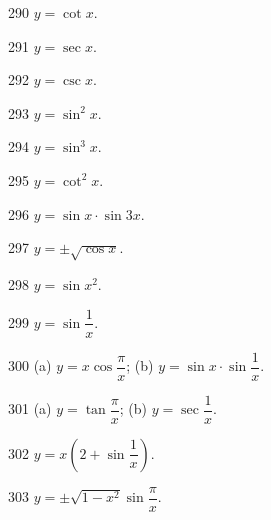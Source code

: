 \begin{prob}[S]{290}
$y = \cot x$.
\end{prob}

\begin{prob}[S]{291}
$y = \sec x$.
\end{prob}

\begin{prob}[S]{292}
$y = \csc x$.
\end{prob}

\begin{prob}[S]{293}
$y = \sin^2 x$.
\end{prob}

\begin{prob}[S]{294}
$y = \sin^3 x$.
\end{prob}

\begin{prob}[S]{295}
$y = \cot^2 x$.
\end{prob}

\begin{prob}[S]{296}
$y = \sin x \cdot \sin 3x$.
\end{prob}

\begin{prob}[S]{297}
$y = \pm\sqrt{\cos x}$.
\end{prob}


\begin{prob}[S]{298}
$y = \sin x^2$.
\end{prob}

\begin{prob}[S]{299}
$y = \sin\dfrac{1}{x}$.
\end{prob}

\begin{prob}[M]{300}
(a) $y = x\cos\dfrac{\pi}{x}$; \qquad (b) $y = \sin x \cdot \sin\dfrac{1}{x}$.
\end{prob}

\begin{prob}[M]{301}
(a) $y = \tan\dfrac{\pi}{x}$; \qquad (b) $y = \sec\dfrac{1}{x}$.
\end{prob}

\begin{prob}[S]{302}
$y = x\left(2 + \sin\dfrac{1}{x}\right)$.
\end{prob}

\begin{prob}[S]{303}
$y = \pm\sqrt{1 - x^2}\sin\dfrac{\pi}{x}$.
\end{prob}

